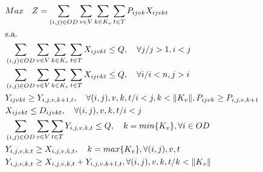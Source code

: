 \begin{align}
	 & Max \quad Z = \sum_{(i,j)\in OD} \sum_{v\in V} \sum_{k\in K_v} \sum_{t\in T} P_{ijvk} X_{ijvkt}                                 \label{eq: m2_fo}                          \\
	 & \text{s.a.}  \notag                                                                                                                                                        \\
	 & \sum_{(i,j)\in OD}\sum_{v\in V}\sum_{k\in K_v}\sum_{t\in T}X_{ijvkt} \leq Q , \quad \forall j / j>1, i<j                        \label{eq: m2_cap_assig_destino}           \\
	 & \sum_{(i,j)\in OD}\sum_{v\in V}\sum_{k\in K_v}\sum_{t\in T}X_{ijvkt} \leq Q , \quad \forall i / i<n, j>i                        \label{eq: m2_cap_assig_origem}            \\
	 & Y_{ijvkt} \geq Y_{i,j,v,k+1,t},  \quad \forall (i,j),v,k,t / i < j, k < \lVert K_v \rVert,  P_{ijvk} \geq P_{i,j,v,k+1}         \label{eq: m2_jerar_class}                 \\
	 & X_{ijvkt} \leq D_{ijvkt},  \quad \forall (i,j),v,k,t/ i < j                                                                     \label{eq: m2_assig_menor_dem}             \\
	 & \sum_{(i,j) \in OD}\sum_{v\in V}\sum_{t\in T} Y_{i,j,v,k,t} \leq Q, \quad  k = min\{K_v\}, \forall i \in OD                     \label{eq: m2_cap_autho_1er_class}         \\
	 & Y_{i,j,v,k,t} \geq  X_{i,j,v,k,t},  \quad k = max\{K_v\}, \forall(i,j),v,t                                                      \label{eq: m2_autho_mayor_assig_1er_class} \\
	 & Y_{i,j,v,k,t} \geq  X_{i,j,v,k,t} + Y_{i,j,v,k + 1,t} , \forall(i,j),v, k, t / k < \lVert K_v\rVert                             \label{eq: m2_autho_mayor_assig_mas_autho} %
\end{align}
